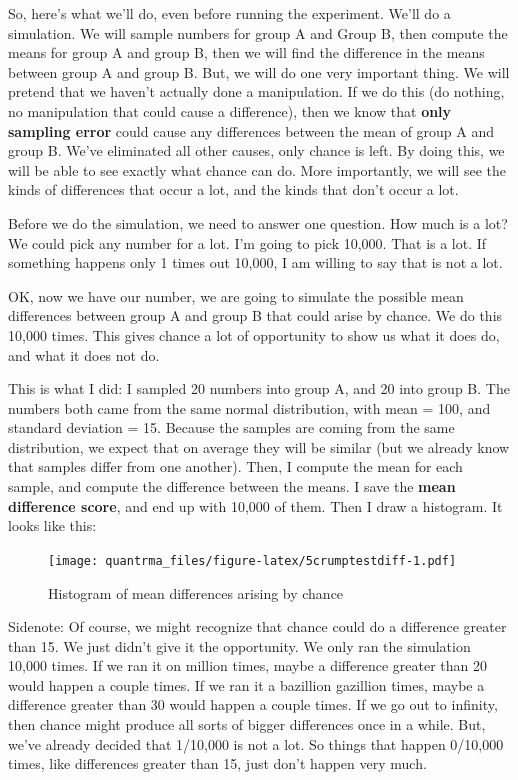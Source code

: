 \documentclass[
]{book}
\begin{document}
So, here's what we'll do, even before running the experiment. We'll do a simulation. We will sample numbers for group A and Group B, then compute the means for group A and group B, then we will find the difference in the means between group A and group B. But, we will do one very important thing. We will pretend that we haven't actually done a manipulation. If we do this (do nothing, no manipulation that could cause a difference), then we know that \textbf{only sampling error} could cause any differences between the mean of group A and group B. We've eliminated all other causes, only chance is left. By doing this, we will be able to see exactly what chance can do. More importantly, we will see the kinds of differences that occur a lot, and the kinds that don't occur a lot.

Before we do the simulation, we need to answer one question. How much is a lot? We could pick any number for a lot. I'm going to pick 10,000. That is a lot. If something happens only 1 times out 10,000, I am willing to say that is not a lot.

OK, now we have our number, we are going to simulate the possible mean differences between group A and group B that could arise by chance. We do this 10,000 times. This gives chance a lot of opportunity to show us what it does do, and what it does not do.

This is what I did: I sampled 20 numbers into group A, and 20 into group B. The numbers both came from the same normal distribution, with mean = 100, and standard deviation = 15. Because the samples are coming from the same distribution, we expect that on average they will be similar (but we already know that samples differ from one another). Then, I compute the mean for each sample, and compute the difference between the means. I save the \textbf{mean difference score}, and end up with 10,000 of them. Then I draw a histogram. It looks like this:

\begin{figure}
\centering
\texttt{[image: quantrma\_files/figure-latex/5crumptestdiff-1.pdf]}
\caption{\label{fig:5crumptestdiff}Histogram of mean differences arising by chance}
\end{figure}

\begin{marginnote}

Sidenote: Of course, we might recognize that chance could do a difference greater than 15. We just didn't give it the opportunity. We only ran the simulation 10,000 times. If we ran it on million times, maybe a difference greater than 20 would happen a couple times. If we ran it a bazillion gazillion times, maybe a difference greater than 30 would happen a couple times. If we go out to infinity, then chance might produce all sorts of bigger differences once in a while. But, we've already decided that 1/10,000 is not a lot. So things that happen 0/10,000 times, like differences greater than 15, just don't happen very much.

\end{marginnote}
\end{document}
